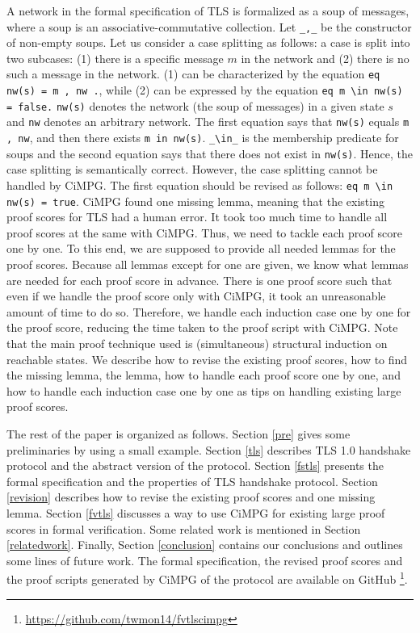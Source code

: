 \documentclass[a4paper,fleqn]{cas-dc}
\begin{document}
A network in the formal specification of TLS is formalized as a soup of messages, where a soup is an associative-commutative collection. Let \verb|_,_| be the constructor of non-empty soups. Let us consider a case splitting as follows: a case is split into two subcases: (1) there is a specific message $m$ in the network and (2) there is no such a message in the network. (1) can be characterized by the equation \verb!eq nw(s) = m , nw .!, while (2) can be expressed by the equation \verb!eq m \in nw(s) = false.! \verb!nw(s)! denotes the network (the soup of messages) in a given state $s$ and \verb!nw! denotes an arbitrary network. The first equation says that \verb!nw(s)! equals \verb!m , nw!, and then there exists \verb!m in nw(s)!. \verb|_\in_| is the membership predicate for soups and the second equation says that there does not exist in \verb!nw(s)!. Hence, the case splitting is semantically correct. However, the case splitting cannot be handled by CiMPG. The first equation should be revised as follows: 
\verb!eq m \in nw(s) = true!. CiMPG found one missing lemma, meaning that the existing proof scores for TLS had a human error. It took too much time to handle all proof scores at the same with CiMPG. Thus, we need to tackle each proof score one by one. To this end, we are supposed to provide all needed lemmas for the proof scores. Because all lemmas except for one are given, we know what lemmas are needed for each proof score in advance. There is one proof score such that even if we handle the proof score only with CiMPG, it took an unreasonable amount of time to do so. Therefore, we handle each induction case one by one for the proof score, reducing the time taken to the proof script with CiMPG. Note that the main proof technique used is (simultaneous) structural induction on reachable states. We describe how to revise the existing proof scores, how to find the missing lemma, the lemma, how to handle each proof score one by one, and how to handle each induction case one by one as tips on handling existing large proof scores.


The rest of the paper is organized as follows. Section \ref{pre} gives some preliminaries by using a small example. Section \ref{tls} describes TLS 1.0 handshake protocol and the abstract version of the protocol. Section \ref{fstls} presents the formal specification and the properties of TLS handshake protocol.
Section \ref{revision} describes how to revise the existing proof scores and one missing lemma. Section \ref{fvtls} discusses a way to use CiMPG for existing large proof scores in formal verification. Some related work is mentioned in Section \ref{relatedwork}. Finally, Section \ref{conclusion} contains our
conclusions and outlines some lines of future work. 
The formal specification, the revised proof scores and the proof scripts generated by CiMPG of the protocol are available on GitHub \footnote{\url{https://github.com/twmon14/fvtlscimpg}}.
\end{document}
